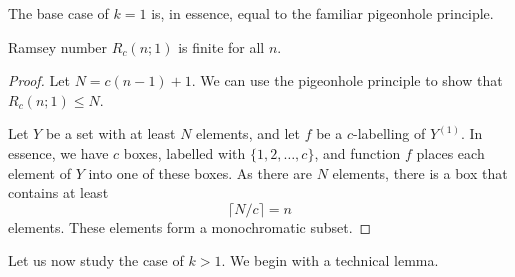 The base case of $k = 1$ is, in essence, equal to the familiar pigeonhole principle.

\begin{lemma}\label{lem:pigeonhole}
    Ramsey number $R_c(n;1)$ is finite for all $n$.
\end{lemma}
\begin{proof}
    Let $N = c(n-1)+1$. We can use the pigeonhole principle to show that $R_c(n;1) \le N$.
    
    Let $Y$ be a set with at least $N$ elements, and let $f$ be a $c$-labelling of $Y^{(1)}$.
    In essence, we have $c$ boxes, labelled with $\{1,2,\dotsc,c\}$, and function $f$ places each element of $Y$ into one of these boxes.
    As there are $N$ elements, there is a box that contains at least
    \[
        \lceil N/c \rceil = n
    \]
    elements. These elements form a monochromatic subset.
\end{proof}

Let us now study the case of $k > 1$. We begin with a technical lemma.


